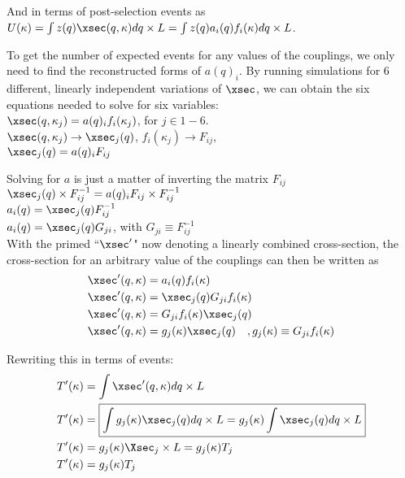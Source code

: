     And in terms of post-selection events as\\
    $U(\kappa) = \int z(q) \xsec(q,\kappa) dq \times L = \int z(q) a_i(q) f_i(\kappa) dq \times L $.

    To get the number of expected events for any values of the couplings, we only need to find the reconstructed forms of $a(q)_{i}$.
    By running simulations for 6 different, linearly independent variations of $\xsec$, we can obtain the six equations needed to solve for six variables:\\
    $\xsec(q, \kappa_j) = a(q)_{i} f_i(\kappa_j) $, for $j \in {1-6}$. \\
    $\xsec(q, \kappa_j) \to  \xsec_j(q) $, $f_i(\kappa_j) \to F_{ij} $, \\
    $\xsec_{j}(q) = a(q)_{i} F_{ij}$

    Solving for $a$ is just a matter of inverting the matrix $F_{ij}$ \\
    $\xsec_{j}(q) \times F_{ij}^{-1}= a(q)_{i} F_{ij} \times F_{ij}^{-1}$ \\
    $a_{i}(q) = \xsec_{j}(q) F_{ij}^{-1}$ \\
    $a_{i}(q) = \xsec_{j}(q) G_{ji}$, with $G_{ji} \equiv F_{ij}^{-1}$ \\

    With the primed ``$\xsec'$" now denoting a linearly combined cross-section,
        the cross-section for an arbitrary value of the couplings can then be written as
    \begin{equation} \begin{split}
        \xsec'(q, \kappa) &= a_i(q) f_i(\kappa) \\
        \xsec'(q, \kappa) &= \xsec_{j}(q) G_{ji} f_i(\kappa) \\
        \xsec'(q, \kappa) &=  G_{ji} f_i(\kappa) \xsec_{j}(q) \\
        \xsec'(q, \kappa) &=  g_j(\kappa) \xsec_{j}(q) \quad, g_j(\kappa) \equiv G_{ji} f_i(\kappa)
    \end{split} \end{equation}

    Rewriting this in terms of events:
    \begin{equation} \begin{split}
        T'(\kappa) &= \int \xsec'(q,\kappa) dq \times L \\
        T'(\kappa) &= \boxed{\int g_j(\kappa) \xsec_{j}(q) dq \times L = g_j(\kappa) \int \xsec_{j}(q) dq \times L} \\
        T'(\kappa) &= g_j(\kappa) \Xsec_j \times L = g_j(\kappa) T_j \\
        T'(\kappa) &= g_j(\kappa) T_j
    \end{split} \end{equation}

